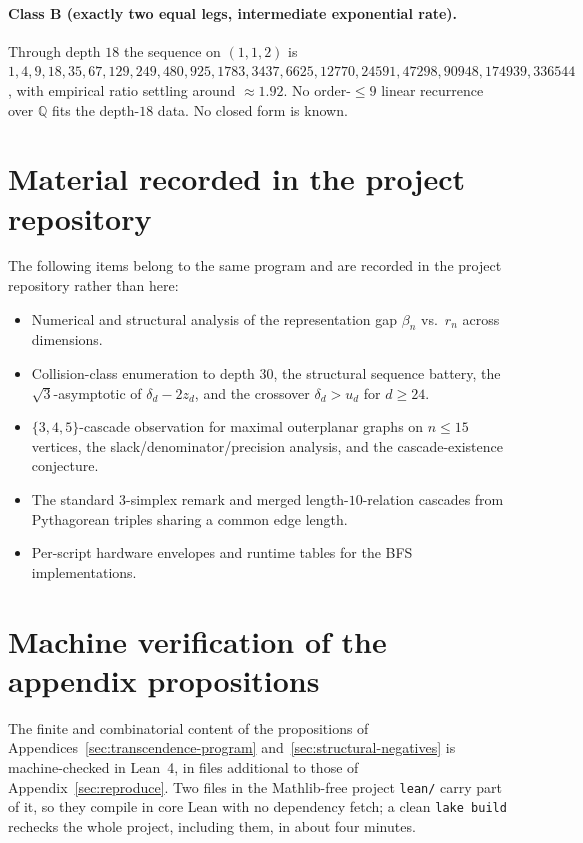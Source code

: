 \documentclass[11pt]{article}
\theoremstyle{plain}
\theoremstyle{definition}
\theoremstyle{remark}
\begin{document}
\paragraph{Class B (exactly two equal legs, intermediate exponential rate).}
Through depth $18$ the sequence on $(1, 1, 2)$ is
$1, 4, 9, 18, 35, 67, 129, 249, 480, 925, 1783, 3437, 6625, 12770,
24591, 47298, 90948, 174939, 336544$, with empirical ratio settling
around $\approx 1.92$.  No order-$\le 9$ linear recurrence over
$\mathbb{Q}$ fits the depth-$18$ data.  No closed form is known.

\section{Material recorded in the project repository}
\label{sec:deferred}

The following items belong to the same program and are recorded in the
project repository rather than here:
\begin{itemize}[leftmargin=*,itemsep=0.15em]
\item Numerical and structural analysis of the representation gap
$\beta_n$ vs.\ $r_n$ across dimensions.
\item Collision-class enumeration to depth $30$, the structural
sequence battery, the $\sqrt{3}$-asymptotic of $\delta_d - 2 z_d$, and
the crossover $\delta_d > u_d$ for $d \ge 24$.
\item $\{3, 4, 5\}$-cascade observation for maximal outerplanar graphs
on $n \le 15$ vertices, the slack/denominator/precision analysis, and
the cascade-existence conjecture.
\item The standard 3-simplex remark and merged length-$10$-relation
cascades from Pythagorean triples sharing a common edge length.
\item Per-script hardware envelopes and runtime tables for the BFS
implementations.
\end{itemize}

\section{Machine verification of the appendix propositions}
\label{sec:extra-lean}

The finite and combinatorial content of the propositions of
Appendices~\ref{sec:transcendence-program}
and~\ref{sec:structural-negatives} is machine-checked in Lean~4, in files
additional to those of Appendix~\ref{sec:reproduce}.
Two files in the Mathlib-free project \texttt{lean/} carry part of it, so they
compile in core Lean with no
dependency fetch; a clean \texttt{lake build} rechecks the whole project, including them, in
about four minutes.
\end{document}
